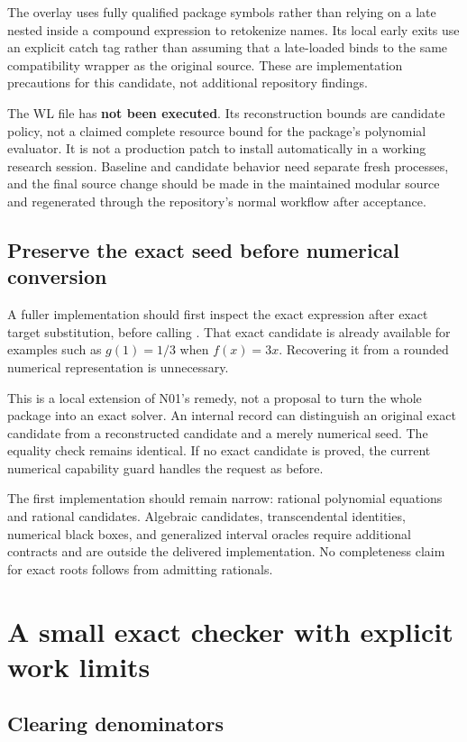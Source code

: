 \documentclass[11pt,letterpaper]{article}
\newcommand{\code}[1]{\texttt{\detokenize{#1}}}
\begin{document}
The overlay uses fully qualified package symbols rather than relying on a late \code{Begin} nested inside a compound expression to retokenize names. Its local early exits use an explicit catch tag rather than assuming that a late-loaded \code{Return} binds to the same compatibility wrapper as the original source. These are implementation precautions for this candidate, not additional repository findings.

The WL file has \textbf{not been executed}. Its reconstruction bounds are candidate policy, not a claimed complete resource bound for the package's polynomial evaluator. It is not a production patch to install automatically in a working research session. Baseline and candidate behavior need separate fresh processes, and the final source change should be made in the maintained modular source and regenerated through the repository's normal workflow after acceptance.

\subsection{Preserve the exact seed before numerical conversion}

A fuller implementation should first inspect the exact expression after exact target substitution, before calling \code{N}. That exact candidate is already available for examples such as $g(1)=1/3$ when $f(x)=3x$. Recovering it from a rounded numerical representation is unnecessary.

This is a local extension of N01's remedy, not a proposal to turn the whole package into an exact solver. An internal record can distinguish an original exact candidate from a reconstructed candidate and a merely numerical seed. The equality check remains identical. If no exact candidate is proved, the current numerical capability guard handles the request as before.

The first implementation should remain narrow: rational polynomial equations and rational candidates. Algebraic candidates, transcendental identities, numerical black boxes, and generalized interval oracles require additional contracts and are outside the delivered implementation. No completeness claim for exact roots follows from admitting rationals.

\section{A small exact checker with explicit work limits}
\subsection{Clearing denominators}
\end{document}
